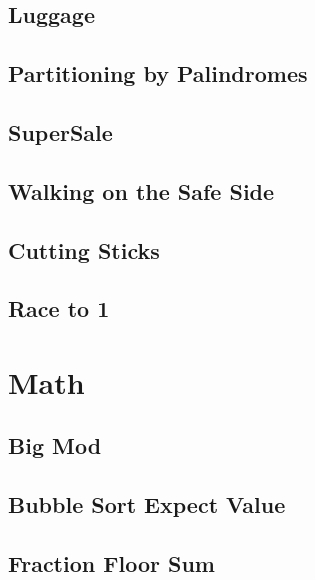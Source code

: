         \subsection{Luggage}
                
        \subsection{Partitioning by Palindromes}
                
        \subsection{SuperSale}
                
        \subsection{Walking on the Safe Side}
                
        \subsection{Cutting Sticks}
                
        \subsection{Race to 1}
                

\section{Math}
        \subsection{Big Mod}
                
        \subsection{Bubble Sort Expect Value}
                
        \subsection{Fraction Floor Sum}
                
